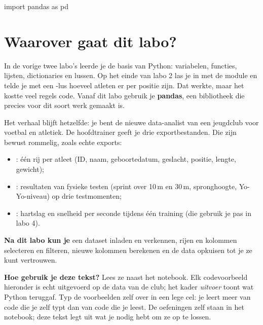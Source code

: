 \documentclass[11pt,a4paper]{article}
\author{dr. Maarten Slembrouck}
\begin{document}

\begin{python}[hide]
import pandas as pd
\end{python}

\section*{Waarover gaat dit labo?}

In de vorige twee labo's leerde je de basis van Python: variabelen,
functies, lijsten, dictionaries en lussen. Op het einde van labo 2 las
je  in met de module  en telde je met een
-lus hoeveel atleten er per positie zijn. Dat werkte, maar het
kostte veel regels code. Vanaf dit labo gebruik je \textbf{pandas}, een
bibliotheek die precies voor dit soort werk gemaakt is.

Het verhaal blijft hetzelfde: je bent de nieuwe data-analist van een
jeugdclub voor voetbal en atletiek. De hoofdtrainer geeft je drie
exportbestanden. Die zijn bewust rommelig, zoals echte exports:

\begin{itemize}
  \item {}: één rij per atleet (ID, naam, geboortedatum,
        geslacht, positie, lengte, gewicht);
  \item {}: resultaten van fysieke testen (sprint over
        10\,m en 30\,m, spronghoogte, Yo-Yo-niveau) op drie testmomenten;
  \item {}: hartslag en snelheid per seconde tijdens
        één training (die gebruik je pas in labo 4).
\end{itemize}

\textbf{Na dit labo kun je} een dataset inladen en verkennen, rijen en
kolommen selecteren en filteren, nieuwe kolommen berekenen en de data
opkuisen tot je ze kunt vertrouwen.

\textbf{Hoe gebruik je deze tekst?} Lees ze naast het notebook. Elk
codevoorbeeld hieronder is echt uitgevoerd op de data van de club; het
kader \emph{uitvoer} toont wat Python teruggaf. Typ de voorbeelden zelf
over in een lege cel: je leert meer van code die je zelf typt dan van
code die je leest. De oefeningen zelf staan in het notebook; deze tekst
legt uit wat je nodig hebt om ze op te lossen.

\end{document}
